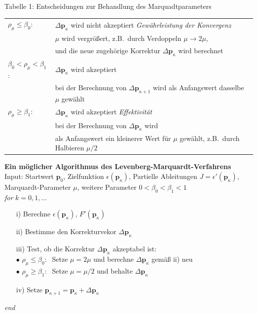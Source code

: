 Tabelle 1: Entscheidungen zur Behandlung des Marquadtparameters

\begin{tabular}{ll}
\hline\hline
$\rho_{\mu} \le \beta_0 $: &
$\Delta \mathbf{p}_\kappa$ wird nicht akzeptiert \textsl{Gewährleistung der Konvergenz} \\
 & $\mu$ wird vergrößert, z.B.\ durch Verdoppeln  $\mu \rightarrow 2 \mu$,\\
 & und die neue zugehörige Korrektur $\Delta \mathbf{p}_\kappa$ wird berechnet\\
\hline
$\beta_0 < \rho_{\mu} < \beta_1$: & $\Delta \mathbf{p}_\kappa$ wird akzeptiert \\
 & bei der Berechnung von $\Delta \mathbf{p}_{\kappa+1}$
  wird als Anfangswert dasselbe $\mu$ gewählt \\ 
\hline
$\rho_{\mu} \ge \beta_1$: & $\Delta \mathbf{p}_\kappa$ wird akzeptiert \textsl{Effektivität}\\
 & bei der Berechnung  von $\Delta \mathbf{p}_\kappa$ wird \\ 
 & als Anfangswert ein kleinerer Wert für $\mu$ gewählt, z.B.\ durch Halbieren $\mu / 2$ \\
\hline\hline
\end{tabular}

\newpage
\textbf{Ein möglicher Algorithmus des Levenberg-Marquardt-Verfahrens} \\
Input: Startwert $\mathbf{p}_0$, Zielfunktion $\epsilon(\mathbf{p}_{\kappa})$, Partielle Ableitungen $J=\epsilon'(\mathbf{p}_{\kappa})$, Marquardt-Parameter $\mu$, weitere Parameter $0 < \beta_0 < \beta_1 < 1$  \\
\hspace*{1em} \textit{for} $k = 0,1, \ldots$
\begin{itemize}
	\item[i)] Berechne $\epsilon(\mathbf{p}_{\kappa})$, $F'(\mathbf{p}_{\kappa})$ 
	\item[ii)] Bestimme den Korrekturvekor $\Delta \mathbf{p}_\kappa$ 
	\item[iii)] Test, ob die Korrektur $\Delta \mathbf{p}_\kappa$  akzeptabel ist: \\
	$\bullet$ $\rho_{\mu} \le \beta_0: \;$ Setze $\mu = 2 \mu $ und berechne $ \Delta \mathbf{p}_\kappa$ gemäß ii) neu \\
	$\bullet$  $\rho_{\mu} \ge \beta_1: \;$ Setze $\mu = \mu / 2 $ und behalte 
	$\Delta \mathbf{p}_\kappa$
	\item[iv)] Setze $\mathbf{p}_{\kappa +1} = \mathbf{p}_\kappa +  \Delta \mathbf{p}_\kappa $
\end{itemize}
\hspace*{1em} \textit{end} \\

